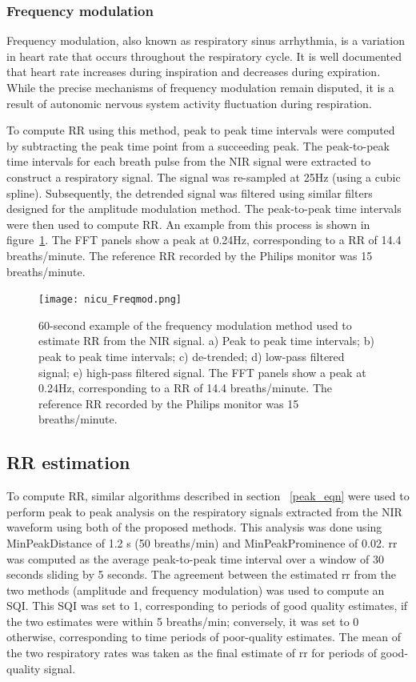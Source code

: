 \subsubsection{Frequency modulation} 

Frequency modulation, also known as respiratory sinus arrhythmia, is a variation in heart rate that occurs throughout the respiratory cycle. It is well documented that heart rate increases during inspiration and decreases during expiration. While the precise mechanisms of frequency modulation remain disputed, it is a result of autonomic nervous system activity fluctuation during respiration.

To compute RR using this method, peak to peak time intervals were computed by subtracting the peak time point from a succeeding peak. The peak-to-peak time intervals for each breath pulse from the NIR signal were extracted to construct a respiratory signal. The signal was re-sampled at 25Hz (using a cubic spline). Subsequently, the detrended signal was filtered using similar filters designed for the amplitude modulation method. The peak-to-peak time intervals were then used to compute RR. An example from this process is shown in figure~\ref{Freqmod}. The FFT panels show a peak at 0.24Hz, corresponding to a RR of 14.4 breaths/minute. The reference RR recorded by the Philips monitor was 15 breaths/minute.


\begin{figure}[!ht]
    \centering
\texttt{[image: nicu\_Freqmod.png]}
    \caption [60-second example of the frequency modulation method used to estimate RR from the NIR signal.]{60-second example of the frequency modulation method used to estimate RR from the NIR signal. a) Peak to peak time intervals; b) peak to peak time intervals; c) de-trended; d) low-pass filtered signal; e) high-pass filtered signal. The FFT panels show a peak at 0.24Hz, corresponding to a RR of 14.4 breaths/minute. The reference RR recorded by the Philips monitor was 15 breaths/minute.}
    \label{Freqmod} 
\end{figure}

\subsection{RR estimation}

To compute RR, similar algorithms described in section ~\ref{peak_eqn} were used to perform peak to peak analysis on the respiratory signals extracted from the NIR waveform using both of the proposed methods. This analysis was done using MinPeakDistance of 1.2 s (50 breaths/min) and MinPeakProminence of 0.02. \gls{rr} was computed as the average peak-to-peak time interval over a window of 30 seconds sliding by 5 seconds. The agreement between the estimated \gls{rr} from the two methods (amplitude and frequency modulation) was used to compute an SQI. This SQI was set to 1, corresponding to periods of good quality estimates, if the two estimates were within 5 breaths/min; conversely, it was set to 0 otherwise, corresponding to time periods of poor-quality estimates. The mean of the two respiratory rates was taken as the final estimate of \gls{rr} for periods of good-quality signal.


